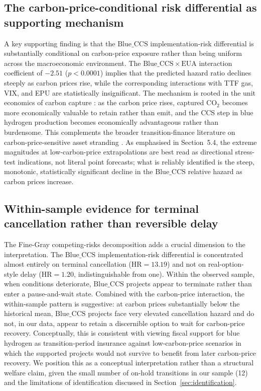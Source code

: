 \documentclass[review,authoryear,11pt]{elsarticle}
\newcommand{\HR}{\mathrm{HR}}
\newcommand{\BlueCCS}{\mathrm{Blue\_CCS}}
\newcommand{\EUA}{\mathrm{EUA}}
\begin{document}
\subsection{The carbon-price-conditional risk differential as supporting mechanism}

A key supporting finding is that the $\BlueCCS$ implementation-risk differential is substantially conditional on carbon-price exposure rather than being uniform across the macroeconomic environment. The $\BlueCCS \times \EUA$ interaction coefficient of $-2.51$ ($p < 0.0001$) implies that the predicted hazard ratio declines steeply as carbon prices rise, while the corresponding interactions with TTF gas, VIX, and EPU are statistically insignificant. The mechanism is rooted in the unit economics of carbon capture \citep{Bui2018, Budinis2018}: as the carbon price rises, captured $\mathrm{CO}_2$ becomes more economically valuable to retain rather than emit, and the CCS step in blue hydrogen production becomes economically advantageous rather than burdensome. This complements the broader transition-finance literature on carbon-price-sensitive asset stranding \citep{Mercure2018, Caldecott2018, BoltonKacperczyk2021}. As emphasised in Section~5.4, the extreme magnitudes at low-carbon-price extrapolations are best read as directional stress-test indications, not literal point forecasts; what is reliably identified is the steep, monotonic, statistically significant decline in the $\BlueCCS$ relative hazard as carbon prices increase.

\subsection{Within-sample evidence for terminal cancellation rather than reversible delay}

The Fine-Gray competing-risks decomposition adds a crucial dimension to the interpretation. The $\BlueCCS$ implementation-risk differential is concentrated almost entirely on terminal cancellation ($\HR = 13.19$) and not on real-option-style delay ($\HR = 1.20$, indistinguishable from one). Within the observed sample, when conditions deteriorate, $\BlueCCS$ projects appear to terminate rather than enter a pause-and-wait state. Combined with the carbon-price interaction, the within-sample pattern is suggestive: at carbon prices substantially below the historical mean, $\BlueCCS$ projects face very elevated cancellation hazard and do not, in our data, appear to retain a discernible option to wait for carbon-price recovery. Conceptually, this is consistent with viewing fiscal support for blue hydrogen as transition-period insurance against low-carbon-price scenarios in which the supported projects would not survive to benefit from later carbon-price recovery. We position this as a conceptual interpretation rather than a structural welfare claim, given the small number of on-hold transitions in our sample (12) and the limitations of identification discussed in Section~\ref{sec:identification}.
\end{document}
